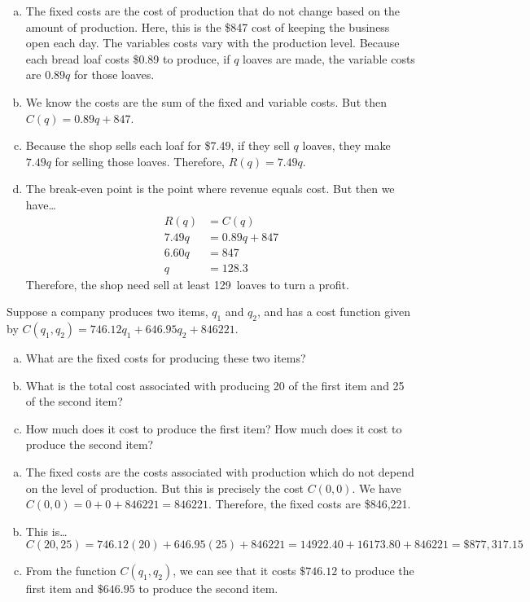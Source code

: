 \documentclass[11pt,letterpaper]{article}
\begin{document}
\sol 
\begin{enumerate}[(a)]
\item The fixed costs are the cost of production that do not change based on the amount of production. Here, this is the \$847 cost of keeping the business open each day. The variables costs vary with the production level. Because each bread loaf costs \$0.89 to produce, if $q$ loaves are made, the variable costs are $0.89q$ for those loaves. \pspace

\item We know the costs are the sum of the fixed and variable costs. But then $C(q)= 0.89q + 847$. \pspace

\item Because the shop sells each loaf for \$7.49, if they sell $q$ loaves, they make $7.49q$ for selling those loaves. Therefore, $R(q)= 7.49q$. \pspace

\item The break-even point is the point where revenue equals cost. But then we have\dots
	\[
	\begin{aligned}
	R(q)&= C(q) \\[0.3cm]
	7.49q&= 0.89q + 847 \\[0.3cm]
	6.60q&= 847 \\[0.3cm]
	q&= 128.3
	\end{aligned}
	\]
Therefore, the shop need sell at least 129~loaves to turn a profit. 
\end{enumerate}



\newpage



 Suppose a company produces two items, $q_1$ and $q_2$, and has a cost function given by $C(q_1, q_2)= 746.12q_1 + 646.95q_2 + 846221$. 
	\begin{enumerate}[(a)]
	\item What are the fixed costs for producing these two items?
	\item What is the total cost associated with producing 20 of the first item and 25 of the second item?
	\item How much does it cost to produce the first item? How much does it cost to produce the second item?
	\end{enumerate} \pspace

\sol 
\begin{enumerate}[(a)]
\item The fixed costs are the costs associated with production which do not depend on the level of production. But this is precisely the cost $C(0, 0)$. We have $C(0, 0)= 0 + 0 + 846221= 846221$. Therefore, the fixed costs are \$846,221. \pspace

\item This is\dots
	\[
	C(20, 25)= 746.12(20) + 646.95(25) + 846221= 14922.40 + 16173.80 + 846221= \$877,317.15
	\] \pspace

\item From the function $C(q_1, q_2)$, we can see that it costs $\$746.12$ to produce the first item and $\$646.95$ to produce the second item. 
\end{enumerate}
\end{document}
